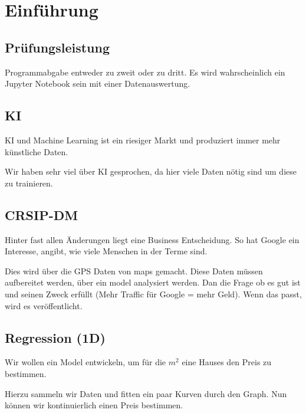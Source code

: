 \documentclass[a4paper]{article}
\title{\docTitle}
\author{Moritz}
\date{\today}
\begin{document}
\maketitle
\tableofcontents


\section{Einführung}

\subsection{Prüfungsleistung}

Programmabgabe entweder zu zweit oder zu dritt. Es wird wahrscheinlich ein Jupyter Notebook sein mit einer Datenauswertung.

\subsection{KI}

KI und Machine Learning ist ein riesiger Markt und produziert immer mehr künstliche Daten.

Wir haben sehr viel über KI gesprochen, da hier viele Daten nötig sind um diese zu trainieren.

\subsection{CRSIP-DM}

Hinter fast allen Änderungen liegt eine Business Entscheidung. So hat Google ein Interesse, angibt, wie viele Menschen in der Terme sind.

Dies wird über die GPS Daten von maps gemacht. Diese Daten müssen aufbereitet werden, über ein model analysiert werden. Dan die Frage ob es gut ist und seinen Zweck erfüllt (Mehr Traffic für Google = mehr Geld). Wenn das passt, wird es veröffentlicht.

\subsection{Regression (1D)}

Wir wollen ein Model entwickeln, um für die $m^2$ eine Hauses den Preis zu bestimmen.

Hierzu sammeln wir Daten und fitten ein paar Kurven durch den Graph. Nun können wir kontinuierlich einen Preis bestimmen.
\end{document}
